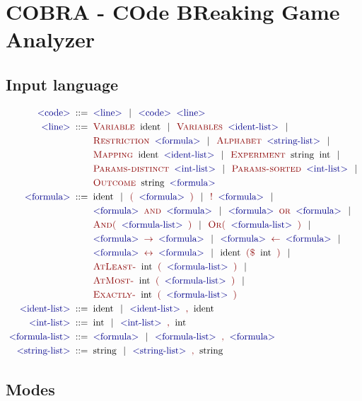 \chapter{COBRA - COde BReaking Game Analyzer}

\section{Input language}

\newcommand{\symb}[1]{\;\textcolor{DarkBlue}{\textrm{$<$#1$>$}}\;}
\newcommand{\txt}[1]{\;\textcolor{DarkRed}{\textsc{#1}}\;}
\newcommand{\term}[1]{\;\textrm{#1}\;}
\begin{align*}
\symb{code} ::=\;& \symb{line} \| \symb{code} \symb{line}\\
\symb{line} ::=\;& \txt{Variable} \term{ident} \| \txt{Variables} \symb{ident-list} \| \\
  & \txt{Restriction} \symb{formula} \| \txt{Alphabet} \symb{string-list} \| \\
  & \txt{Mapping} \term{ident} \symb{ident-list} \| \txt{Experiment} \term{string} \term{int} \| \\
  & \txt{Params-distinct} \symb{int-list} \| \txt{Params-sorted} \symb{int-list} \| \\
  & \txt{Outcome} \term{string} \symb{formula} \\
\symb{formula} ::=\;&  \term{ident} \| \txt{(} \symb{formula} \txt{)} \| \txt{!} \symb{formula} \| \\
 & \symb{formula} \txt{and} \symb{formula} \| \symb{formula} \txt{or} \symb{formula} \| \\
 & \txt{And(} \symb{formula-list} \txt{)} \| \txt{Or(} \symb{formula-list} \txt{)} \| \\
 & \symb{formula} \txt{$\rightarrow$} \symb{formula} \| \symb{formula} \txt{$\leftarrow$} \symb{formula} \| \\
 & \symb{formula} \txt{$\leftrightarrow$} \symb{formula} \| \term{ident} \txt{(\$} \term{int} \txt{)} \| \\
 & \txt{AtLeast-} \term{int} \txt{(} \symb{formula-list} \txt{)} \| \\
 & \txt{AtMost-} \term{int} \txt{(} \symb{formula-list} \txt{)} \| \\
 & \txt{Exactly-} \term{int} \txt{(} \symb{formula-list} \txt{)} \\
\symb{ident-list} ::=\;& \term{ident} \| \symb{ident-list} \txt{,} \term{ident} \\
\symb{int-list} ::=\;& \term{int} \| \symb{int-list} \txt{,} \term{int} \\
\symb{formula-list} ::=\;& \symb{formula} \| \symb{formula-list} \txt{,} \symb{formula} \\
\symb{string-list} ::=\;& \term{string} \| \symb{string-list} \txt{,} \term{string}
\end{align*}

\section{Modes}
